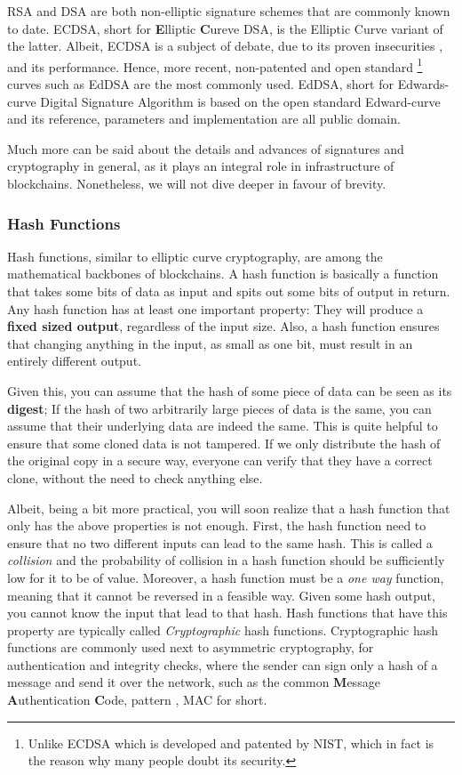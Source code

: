 RSA and DSA are both non-elliptic signature schemes that are commonly known to date. ECDSA, short
for \textbf{E}lliptic \textbf{C}ureve DSA, is the Elliptic Curve variant of the latter. Albeit,
ECDSA is a subject of debate, due to its proven insecurities
\cite{Brumley_Tuveri_2011_remote_timing_ecdsa}, and its performance. Hence, more recent,
non-patented and open standard \footnote{Unlike ECDSA which is developed and patented by NIST, which
in fact is the reason why many people doubt its security.} curves such as EdDSA are the most
commonly used. EdDSA, short for Edwards-curve Digital Signature Algorithm is based on the open
standard Edward-curve and its reference, parameters and implementation are all public domain.

Much more can be said about the details and advances of signatures and cryptography in general, as
it plays an integral role in infrastructure of blockchains. Nonetheless, we will not dive deeper in
favour of brevity.

\subsubsection{Hash Functions} \label{chap_bg:subsec:hash}

Hash functions, similar to elliptic curve cryptography, are among the mathematical backbones of
blockchains. A hash function is basically a function that takes some bits of data as input and spits
out some bits of output in return. Any hash function has at least one important property: They will
produce a \textbf{fixed sized output}, regardless of the input size. Also, a hash function ensures
that changing anything in the input, as small as one bit, must result in an entirely different
output.

Given this, you can assume that the hash of some piece of data can be seen as its \textbf{digest};
If the hash of two arbitrarily large pieces of data is the same, you can assume that their
underlying data are indeed the same. This is quite helpful to ensure that some cloned data is not
tampered. If we only distribute the hash of the original copy in a secure way, everyone can verify
that they have a correct clone, without the need to check anything else.

Albeit, being a bit more practical, you will soon realize that a hash function that only has the
above properties is not enough. First, the hash function need to ensure that no two different inputs
can lead to the same hash. This is called a \textit{collision} and the probability of collision in a
hash function should be sufficiently low for it to be of value. Moreover, a hash function must be a
\textit{one way} function, meaning that it cannot be reversed in a feasible way. Given some hash
output, you cannot know the input that lead to that hash. Hash functions that have this property are
typically called \textit{Cryptographic} hash functions. Cryptographic hash functions are commonly
used next to asymmetric cryptography, for authentication and integrity checks, where the sender can
sign only a hash of a message and send it over the network, such as the common \textbf{M}essage
\textbf{A}uthentication \textbf{C}ode, pattern \cite{HMAC_Bellare_Canetti_Krawczyk_1996}, MAC for
short.

